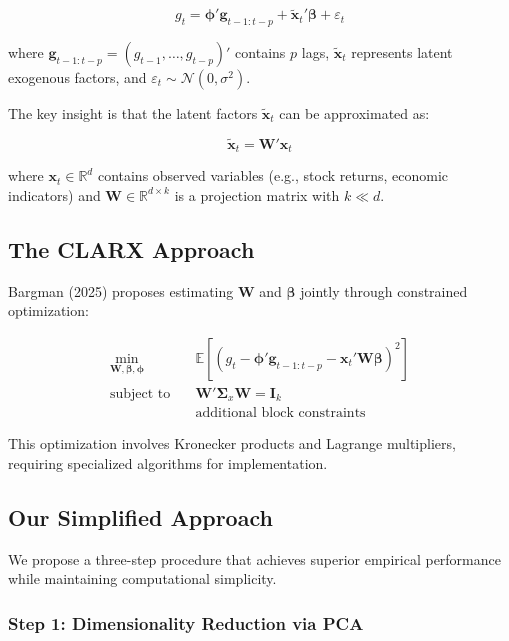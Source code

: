 \documentclass[11pt,letterpaper]{article}
\newcommand{\E}{\mathbb{E}}
\newcommand{\R}{\mathbb{R}}
\newcommand{\N}{\mathcal{N}}
\theoremstyle{plain}
\theoremstyle{definition}
\theoremstyle{remark}
\begin{document}
\begin{equation}
g_t = \bm{\phi}'\bm{g}_{t-1:t-p} + \tilde{\bm{x}}_t'\bm{\beta} + \varepsilon_t
\label{eq:baseline}
\end{equation}

where $\bm{g}_{t-1:t-p} = (g_{t-1}, \ldots, g_{t-p})'$ contains $p$ lags, $\tilde{\bm{x}}_t$ represents latent exogenous factors, and $\varepsilon_t \sim \N(0, \sigma^2)$.

The key insight is that the latent factors $\tilde{\bm{x}}_t$ can be approximated as:

\begin{equation}
\tilde{\bm{x}}_t = \bm{W}'\bm{x}_t
\label{eq:latent}
\end{equation}

where $\bm{x}_t \in \R^d$ contains observed variables (e.g., stock returns, economic indicators) and $\bm{W} \in \R^{d \times k}$ is a projection matrix with $k \ll d$.

\subsection{The CLARX Approach}

Bargman (2025) proposes estimating $\bm{W}$ and $\bm{\beta}$ jointly through constrained optimization:

\begin{align}
\min_{\bm{W}, \bm{\beta}, \bm{\phi}} \quad & \E\left[(g_t - \bm{\phi}'\bm{g}_{t-1:t-p} - \bm{x}_t'\bm{W}\bm{\beta})^2\right] \\
\text{subject to} \quad & \bm{W}'\bm{\Sigma}_x\bm{W} = \bm{I}_k \\
& \text{additional block constraints}
\end{align}

This optimization involves Kronecker products and Lagrange multipliers, requiring specialized algorithms for implementation.

\subsection{Our Simplified Approach}

We propose a three-step procedure that achieves superior empirical performance while maintaining computational simplicity.

\subsubsection{Step 1: Dimensionality Reduction via PCA}
\end{document}
